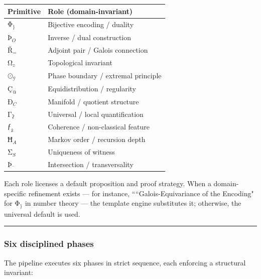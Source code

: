 \documentclass[12pt,a4paper]{article}
\begin{document}
\begin{table}[htbp]
\centering
\small
{}
\begin{tabularx}{\textwidth}{>{\centering\arraybackslash}X >{\centering\arraybackslash}X}
\toprule
\rowcolor{gray!25}\textbf{Primitive} & \textbf{Role (domain-invariant)} \\
\midrule
\rowcolors{1}{white}{gray!10}
$\text{Φ}_{\text{\}}}$ & Bijective encoding / duality \\
$\text{Þ}_{O}$ & Inverse / dual construction \\
$\text{Ř}_{=}$ & Adjoint pair / Galois connection \\
$\text{Ω}_{z}$ & Topological invariant \\
$\text{⊙}_{\text{ÿ}}$ & Phase boundary / extremal principle \\
$\text{Ç}_{@}$ & Equidistribution / regularity \\
$\text{Ð}_{C}$ & Manifold / quotient structure \\
$\text{Γ}_{\text{ʔ}}$ & Universal / local quantification \\
$\text{ƒ}_{\text{ż}}$ & Coherence / non-classical feature \\
$\text{Ħ}_{A}$ & Markov order / recursion depth \\
$\text{Σ}_{S}$ & Uniqueness of witness \\
$\text{Þ}_{\text{¨}}$ & Intersection / transversality \\
\bottomrule
\end{tabularx}
\end{table}

Each role licenses a default proposition and proof strategy. When a domain-specific refinement exists --- for instance, ````Galois-Equivariance of the Encoding" for $\text{Φ}_{\text{\}}}$ in number theory --- the template engine substitutes it; otherwise, the universal default is used.

\begin{center}
\rule{0.5\textwidth}{0.4pt}
\end{center}

\subsubsection{Six disciplined phases}

The pipeline executes six phases in strict sequence, each enforcing a structural invariant:
\end{document}
